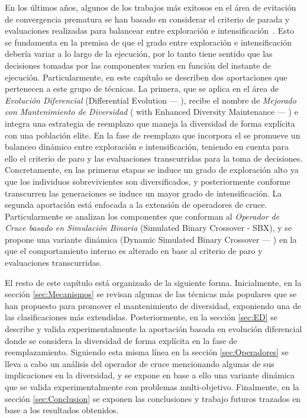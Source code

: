 En los últimos años, algunos de los trabajos más exitosos en el área de evitación de convergencia prematura se han basado en considerar el criterio de parada y evaluaciones
realizadas para balancear entre exploración e intensificación~\cite{segura2016novel}.
%
Esto se fundamenta en la premisa de que el grado entre exploración e intensificación debería variar a lo largo de la ejecución, por lo tanto tiene sentido que las decisiones tomadas por las componentes varíen en función del instante de ejecución.
%
%
Particularmente, en este capítulo se describen dos aportaciones que pertenecen a este grupo de técnicas.
%
La primera, que se aplica en el área de \textit{Evolución Diferencial} (Differential Evolution --- \DE{}), recibe el nombre de \DE{} \textit{Mejorado con Mantenimiento de Diversidad} 
(\DE{} with Enhanced Diversity Maintenance --- \DEEDM{}) e integra una estrategia de reemplazo que maneja la diversidad de forma explícita con una población elite.
%
En la fase de reemplazo que incorpora el \DEEDM{} se promueve un balanceo dinámico entre exploración e intensificación, teniendo en cuenta para ello el criterio de paro
y las evaluaciones transcurridas para la toma de decisiones.
%
Concretamente, en las primeras etapas se induce un grado de exploración alto ya que los individuos sobrevivientes son diversificados, y posteriormente conforme transcurren las 
generaciones se induce un mayor grado de intensificación.
% 
La segunda aportación está enfocada a la extensión de operadores de cruce.
%
Particularmente se analizan los componentes que conforman al \textit{Operador de Cruce basado en Simulación Binaria} (Simulated Binary Crossover - SBX), 
y se propone una variante dinámica (Dynamic Simulated Binary Crossover --- \DSBX{}) en la que el comportamiento interno es alterado en base al criterio de paro y evaluaciones transcurridas.

El resto de este capítulo está organizado de la siguiente forma.
%
Inicialmente, en la sección \ref{sec:Mecanismos} se revisan algunas de las técnicas más populares que se han propuesto para promover el mantenimiento de diversidad, exponiendo una de las clasificaciones más extendidas.
%
Posteriormente, en la sección \ref{sec:ED} se describe y valida experimentalmente la aportación basada en evolución diferencial donde se considera la diversidad de forma explícita en la fase de reemplazamiento.
%
Siguiendo esta misma línea en la sección \ref{sec:Operadores} se lleva a cabo un análisis del operador de cruce \SBX{} mencionando algunas de sus implicaciones en la diversidad, 
y se expone en base a ello una variante dinámica que se valida experimentalmente con problemas multi-objetivo.
%
Finalmente, en la sección \ref{sec:Conclusion} se exponen las conclusiones y trabajo futuros trazados en base a los resultados obtenidos.
%
